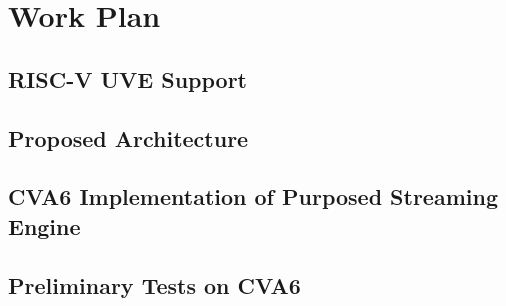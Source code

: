 
\chapter{Work Plan}
\label{chapter:work_plan}


\section{RISC-V UVE Support}
\section{Proposed Architecture}
\section{CVA6 Implementation of Purposed Streaming Engine }
\section{Preliminary Tests on CVA6}
